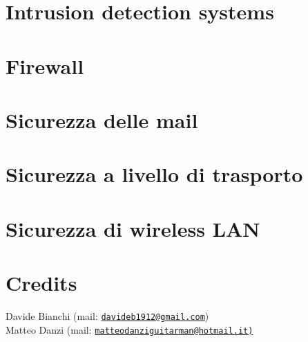 \documentclass[a4paper, 11pt]{article}
\newcommand{\mail}[1]{\href{mailto:#1}{\texttt{#1}}}
\begin{document}
\begin{multicols}{2}
	\section{Intrusion detection systems}
	
	\section{Firewall}
	
	\section{Sicurezza delle mail}
	
	\section{Sicurezza a livello di trasporto}
	
	\section{Sicurezza di wireless LAN}
		
		
		
		
		
		
	
	
	
	
	
	
	
	
	
	
	
	
	
	\end{multicols}

	\section{Credits}
	Davide Bianchi (mail: \mail{davideb1912@gmail.com}) \\
	Matteo Danzi (mail: \mail{matteodanziguitarman@hotmail.it)}
	
\end{document}
